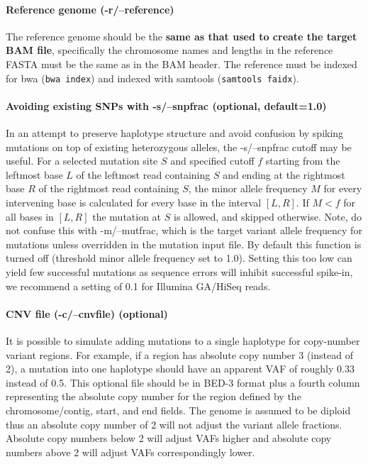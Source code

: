 \documentclass[letterpaper,11pt]{article}
\begin{document}
\paragraph{Reference genome (-r/--reference)}
	The reference genome should be the \textbf{same as that used to create the target BAM file}, specifically the chromosome names and lengths in the reference FASTA must be the same as in the BAM header. The reference must be indexed for bwa (\texttt{bwa index}) and indexed with samtools (\texttt{samtools faidx}).
	
\paragraph{Avoiding existing SNPs with -s/--snpfrac (optional, default=1.0)}
	In an attempt to preserve haplotype structure and avoid confusion by spiking mutations on top of existing heterozygous alleles, the -s/--snpfrac cutoff may be useful. For a selected mutation site $S$ and specified cutoff $f$ starting from the leftmost base $L$ of the leftmost read containing $S$ and ending at the rightmost base $R$ of the rightmost read containing $S$, the minor allele frequency $M$ for every intervening base is calculated for every base in the interval $[L,R]$. If $M < f$ for all bases in $[L,R]$ the mutation at $S$ is allowed, and skipped otherwise. Note, do not confuse this with -m/--mutfrac, which is the target variant allele frequency for mutations unless overridden in the mutation input file. By default this function is turned off (threshold minor allele frequency set to 1.0). Setting this too low can yield few successful mutations as sequence errors will inhibit successful spike-in, we recommend a setting of 0.1 for Illumina GA/HiSeq reads.

\paragraph{CNV file (-c/--cnvfile) (optional)}
	It is possible to simulate adding mutations to a single haplotype for copy-number variant regions. For example, if a region has absolute copy number 3 (instead of 2), a mutation into one haplotype should have an apparent VAF of roughly 0.33 instead of 0.5. This optional file should be in BED-3 format plus a fourth column representing the absolute copy number for the region defined by the chromosome/contig, start, and end fields. The genome is assumed to be diploid thus an absolute copy number of 2 will not adjust the variant allele fractions. Absolute copy numbers below 2 will adjust VAFs higher and absolute copy numbers above 2 will adjust VAFs correspondingly lower.
\end{document}
